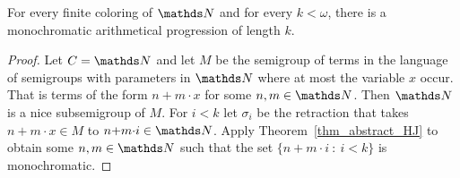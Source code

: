 \begin{void}
  For every finite coloring of $\NN$ and for every $k<\omega$, there is a monochromatic arithmetical progression of length $k$.
\end{void}

\begin{proof}
  Let $C=\NN$ and let $M$ be the semigroup of terms in the language of semigroups with parameters in $\NN$ where at most the variable $x$ occur.
  That is terms of the form $n{+}m{\cdot}x$ for some $n,m\in\NN$.
  Then $\NN$ is a nice subsemigroup of $M$.
  For $i<k$ let $\sigma_i$ be the retraction that takes $n{+}m{\cdot}x\in M$ to $n{+}m{\cdot}i\in\NN$.
  Apply Theorem~\ref{thm_abstract_HJ} to obtain some $n,m\in\NN$ such that the set $\{n{+}m{\cdot}i\ :\ i<k\}$ is monochromatic.
\end{proof}








